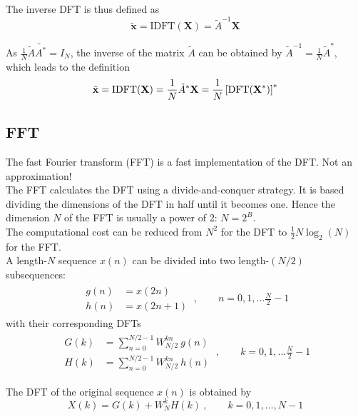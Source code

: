 The inverse DFT is thus defined as
\begin{equation*}
	\tilde{\mathbf{x}} = \text{IDFT}(\mathbf{X}) = \tilde{A}^{-1} \mathbf{X}
\end{equation*}

As $\frac{1}{N} \tilde{A} \tilde{A^*} = I_N$, the inverse of the matrix 
$\tilde{A}$ can be obtained by $\tilde{A}^{-1} = \frac{1}{N} \tilde{A}^*$, 
which leads to the definition
\begin{equation*}
	\tilde{\mathbf{x}} = \text{IDFT}(\mathbf{X}) = \frac{1}{N} \tilde{A}^* \mathbf{X} = \frac{1}{N}\left[ \operatorname{\text{DFT}}(\mathbf{X}^*) \right] ^*
\end{equation*}

\subsection{FFT}
The fast Fourier transform (FFT) is a fast implementation of the DFT.
Not an approximation! \\

The FFT calculates the DFT using a divide-and-conquer strategy. It is based
dividing the dimensions of the DFT in half until it becomes one. Hence
the dimension $N$ of the FFT is usually a power of 2: $N = 2^B$. \\

The computational cost can be reduced from $N^2$ for the DFT to $\frac{1}{2} N \log_2 (N)$ for the FFT. \\

A length-$N$ sequence $x(n)$ can be divided into two length-$(N/2)$ subsequences:
\begin{align*}
	\begin{array}{ll}
		g(n) &= x(2n) \\
		h(n) &= x(2n+1)
	\end{array}
	\:,\qquad n = 0,1,\ldots \frac{N}{2}-1
\end{align*}
with their corresponding DFTs
\begin{align*}
	\begin{array}{ll}
		G(k) &= \sum\limits_{n=0}^{N/2-1} W_{N/2}^{kn} \: g(n) \\
		H(k) &= \sum\limits_{n=0}^{N/2-1} W_{N/2}^{kn} \: h(n)
	\end{array}
	\:,\qquad k=0,1,\ldots \frac{N}{2}-1
\end{align*}

The DFT of the original sequence $x(n)$ is obtained by
\begin{equation*}
	X(k) = G(k) + W_N^k H(k) \:,\qquad k=0,1,\ldots,N-1
\end{equation*}

